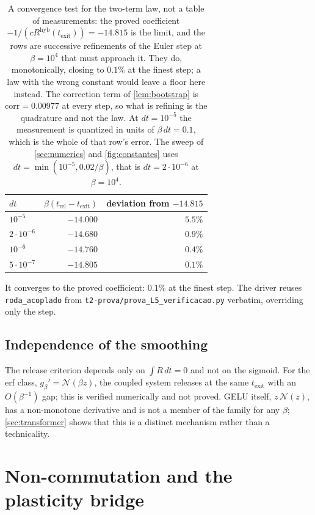 \documentclass[11pt]{article}
\theoremstyle{definition}
\theoremstyle{remark}
\newcommand{\texit}{t_{\mathrm{exit}}}
\newcommand{\hyb}{\mathrm{hyb}}
\begin{document}
\begin{table}[h]
\centering
\caption{A convergence test for the two-term law, not a table of measurements:
the proved coefficient $-1/(cR^{\hyb}(\texit))=-14.815$ is the limit, and the
rows are successive refinements of the Euler step at $\beta=10^{4}$ that must
approach it. They do, monotonically, closing to $0.1\%$ at the finest step; a law
with the wrong constant would leave a floor here instead. The
correction term of \cref{lem:bootstrap} is $\mathrm{corr}=0.00977$ at every step,
so what is refining is the quadrature and not the law. At $dt=10^{-5}$ the
measurement is quantized in units of $\beta\,dt=0.1$, which is the whole of that
row's error. The sweep of \cref{sec:numerics} and \cref{fig:constantes} uses
$dt=\min(10^{-5},0.02/\beta)$, that is $dt=2\cdot10^{-6}$ at $\beta=10^{4}$.}
\label{tab:dt}
\begin{tabular}{lrr}
\toprule
$dt$ & $\beta(t_{\mathrm{rel}}-\texit)$ & deviation from $-14.815$ \\
\midrule
$10^{-5}$          & $-14.000$ & $5.5\%$ \\
$2\cdot10^{-6}$    & $-14.680$ & $0.9\%$ \\
$10^{-6}$          & $-14.760$ & $0.4\%$ \\
$5\cdot10^{-7}$    & $-14.805$ & $0.1\%$ \\
\bottomrule
\end{tabular}
\end{table}

\noindent It converges to the proved coefficient: $0.1\%$ at the finest step.
The driver reuses \texttt{roda\_acoplado} from
\texttt{t2-prova/prova\_L5\_verificacao.py} verbatim, overriding only the step.

\subsection{Independence of the smoothing}\label{sec:regularization}

The release criterion depends only on $\int R\,dt=0$ and not on the sigmoid. For
the erf class, $g_\beta'=\mathcal N(\beta z)$, the coupled system releases at the
same $\texit$ with an $O(\beta^{-1})$ gap; this is verified numerically and not
proved. GELU itself, $z\,\mathcal N(z)$, has a non-monotone derivative and is not
a member of the family for any $\beta$; \cref{sec:transformer} shows that this is
a distinct mechanism rather than a technicality.

\section{Non-commutation and the plasticity bridge}\label{sec:noncomm}
\end{document}
